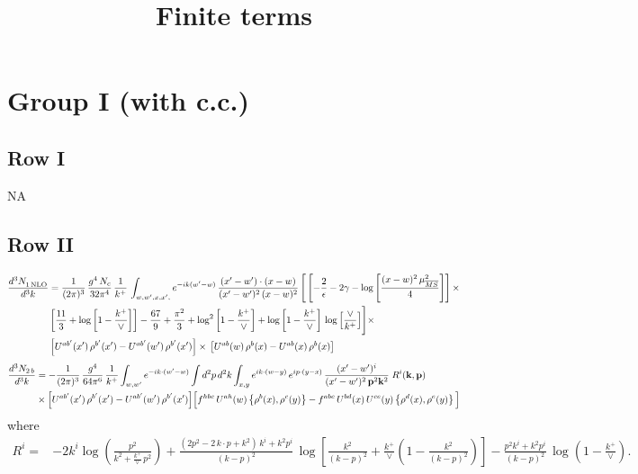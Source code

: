 \documentclass[9pt]{article}
\title{Finite terms}
\author{}
\date{}
\numberwithin{equation}{section}
\begin{document}
\maketitle
\section{Group I (with c.c.)}
\subsection{Row I}
\textsc{NA}
\subsection{Row II}
\begin{align}
     \frac{d^{3}N_{1\,\rm NLO}^{\rm}}{d^{3}k} &  = \frac{1}{(2\pi)^{3}}\, \frac{g^{4}\,N_{c}}{32\pi^{4}}\,\frac{1}{k^{+}}\, \int_{w, w',x,x',} e^{-ik(w^\prime-w)}\, \frac{(x'-w')\cdot (x-w)}{(x'-w')^{2}\, (x-w)^{2}}\, \Bigg[\left[-\frac{2}{\epsilon}-2\gamma-\log{\left[\frac{(x-w)^{2}\,\mu^{2}_{\overline{MS}}}{4}\right]}\right]\times \notag \\ & \left[\frac{11}{3}+\log{\left[1-\frac{k^{+}}{\vee}\right]}\right]-\frac{67}{9}+\frac{\pi^{2}}{3}+\log^{2}{\left[1-\frac{k^{+}}{\vee}\right]}+\log{\left[1-\frac{k^{+}}{\vee}\right]}\,\log{\left[\frac{\vee}{k^{+}}\right]}\Bigg]\times\notag \\ & \left[U^{ab'}(x')\,\rho^{b'}(x') - U^{ab'}(w')\,\rho^{b'}(x')\right]\times\,\left[U^{ab}(w)\,\rho^{b}(x) - U^{ab}(x)\,\rho^{b}(x)\right]
\end{align}
\begin{align}
\frac{d^{3}N_{2\,b}}{d^{3}k} & = -\frac{1}{(2\pi)^{3}}\,\frac{g^{4}}{64\pi^{6}}\,\frac{1}{k^{+}}\int_{w,w'} e^{-ik\cdot(w'-w)}
\int d^{2}p\,d^{2}k\int_{x,y} e^{ik\cdot(w-y)}\,e^{ip\cdot(y-x)}\,\frac{(x'-w')^{i}}{(x'-w')^{2}\,\mathbf{p}^{2}\mathbf{k}^{2}}\;R^{i}(\mathbf{k},\mathbf{p})\notag\\
&\times\Big[U^{ab'}(x')\,\rho^{b'}(x')-U^{ab'}(w')\,\rho^{b'}(x')\Big]
\Big[f^{hbc}\,U^{ah}(w)\left\{\rho^{b}(x),\rho^{c}(y)\right\}-f^{abc}\,U^{bd}(x)\,U^{ce}(y)\left\{\rho^{d}(x),\rho^{e}(y)\right\}\Big]
\end{align}
where
\begin{align}
R^{i} =& -2k^{i}\log\left(\frac{p^{2}}{k^{2}+\frac{k^{+}}{\vee}\,p^{2}}\right)
+\frac{(2p^{2}-2\,k\cdot p+k^{2})\,k^{i}+k^{2}p^{i}}{(k-p)^{2}}\,
\log\left[\frac{k^{2}}{(k-p)^{2}}+\frac{k^{+}}{\vee}\left(1-\frac{k^{2}}{(k-p)^{2}}\right)\right]
-\frac{p^{2}k^{i}+k^{2}p^{i}}{(k-p)^{2}}\,\log\left(1-\frac{k^{+}}{\vee}\right).
\end{align}
\end{document}
